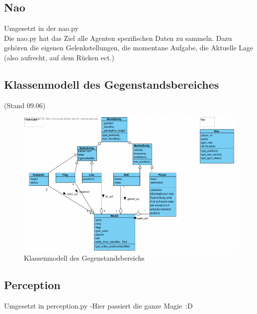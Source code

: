 \subsection*{Nao}
Umgesetzt in der nao.py\\
Die nao.py hat das Ziel alle Agenten spezifischen Daten zu 
sammeln. Dazu gehören die eigenen Gelenkstellungen, die momentane 
Aufgabe, die Aktuelle Lage (also aufrecht, auf dem Rücken ect.)

\subsection*{Klassenmodell des Gegenstandsbereiches}
(Stand 09.06)\\
\begin{figure}[h]
\begin{center}
\includegraphics[scale=0.6]{800px-Weltenmodell}
\end{center}
\caption{Klassenmodell des Gegenstandsbereichs}
\end{figure}


\subsection*{Perception}
Umgesetzt in perception.py -Hier passiert die  ganze Magie~:D

